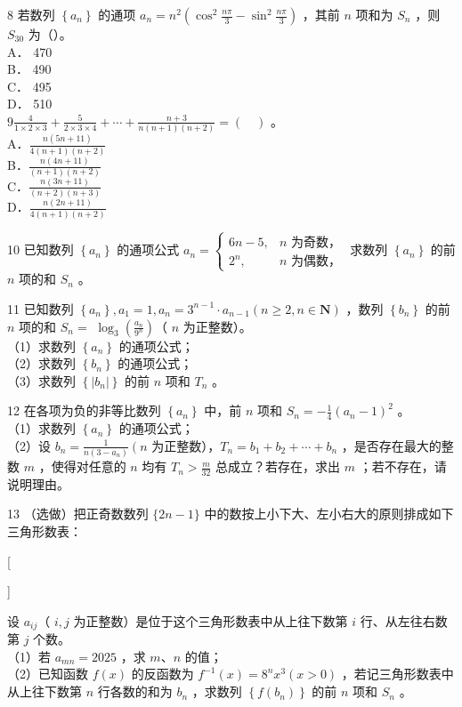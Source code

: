 \documentclass[10pt]{article}
\begin{document}
8 若数列 \(\left\{a_{n}\right\}\) 的通项 \(a_{n}=n^{2}\left(\cos ^{2} \frac{n \pi}{3}-\sin ^{2} \frac{n \pi}{3}\right)\) ，其前 \(n\) 项和为 \(S_{n}\) ，则 \(S_{30}\) 为（）。\\
A． 470\\
B． 490\\
C． 495\\
D． 510\\
\(9 \frac{4}{1 \times 2 \times 3}+\frac{5}{2 \times 3 \times 4}+\cdots+\frac{n+3}{n(n+1)(n+2)}=(\quad)\) 。\\
A．\(\frac{n(5 n+11)}{4(n+1)(n+2)}\)\\
B．\(\frac{n(4 n+11)}{(n+1)(n+2)}\)\\
C．\(\frac{n(3 n+11)}{(n+2)(n+3)}\)\\
D．\(\frac{n(2 n+11)}{4(n+1)(n+2)}\)

10 已知数列 \(\left\{a_{n}\right\}\) 的通项公式 \(a_{n}=\left\{\begin{array}{ll}6 n-5, & n \text { 为奇数，} \\ 2^{n}, & n \text { 为偶数，}\end{array}\right.\) 求数列 \(\left\{a_{n}\right\}\) 的前 \(n\) 项的和 \(S_{n}\) 。

11 已知数列 \(\left\{a_{n}\right\}, a_{1}=1, a_{n}=3^{n-1} \cdot a_{n-1}(n \geqslant 2, n \in \mathbf{N})\) ，数列 \(\left\{b_{n}\right\}\) 的前 \(n\) 项的和 \(S_{n}=\) \(\log _{3}\left(\frac{a_{n}}{9^{n}}\right)\)（ \(n\) 为正整数）。\\
（1）求数列 \(\left\{a_{n}\right\}\) 的通项公式；\\
（2）求数列 \(\left\{b_{n}\right\}\) 的通项公式；\\
（3）求数列 \(\left\{\left|b_{n}\right|\right\}\) 的前 \(n\) 项和 \(T_{n}\) 。

12 在各项为负的非等比数列 \(\left\{a_{n}\right\}\) 中，前 \(n\) 项和 \(S_{n}=-\frac{1}{4}\left(a_{n}-1\right)^{2}\) 。\\
（1）求数列 \(\left\{a_{n}\right\}\) 的通项公式；\\
（2）设 \(b_{n}=\frac{1}{n\left(3-a_{n}\right)}\left(n\right.\) 为正整数），\(T_{n}=b_{1}+b_{2}+\cdots+b_{n}\) ，是否存在最大的整数 \(m\) ，使得对任意的 \(n\) 均有 \(T_{n}>\frac{m}{32}\) 总成立？若存在，求出 \(m\) ；若不存在，请说明理由。

13 （选做）把正奇数数列 \(\{2 n-1\}\) 中的数按上小下大、左小右大的原则排成如下三角形数表：

[

]

设 \(a_{i j}\)（ \(i, j\) 为正整数）是位于这个三角形数表中从上往下数第 \(i\) 行、从左往右数第 \(j\) 个数。\\
（1）若 \(a_{m n}=2025\) ，求 \(m 、 n\) 的值；\\
（2）已知函数 \(f(x)\) 的反函数为 \(f^{-1}(x)=8^{n} x^{3}(x>0)\) ，若记三角形数表中从上往下数第 \(n\) 行各数的和为 \(b_{n}\) ，求数列 \(\left\{f\left(b_{n}\right)\right\}\) 的前 \(n\) 项和 \(S_{n}\) 。
\end{document}
